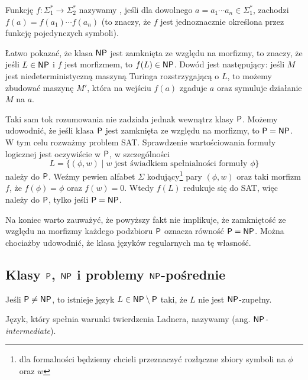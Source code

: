 \begin{remark}
    Funkcję $f : \Sigma_1^* \to \Sigma_2^*$ nazywamy , jeśli dla dowolnego $a = a_1 \cdots a_n \in \Sigma_1^*$, zachodzi $f(a) = f(a_1) \cdots f(a_n)$ (to znaczy, że $f$ jest jednoznacznie określona przez funkcję pojedynczych symboli).

    Łatwo pokazać, że klasa $\textsf{NP}$ jest zamknięta ze względu na morfizmy, to znaczy, że jeśli $L \in \textsf{NP}$ i $f$ jest morfizmem, to $f(L) \in \textsf{NP}$. Dowód jest następujący: jeśli $M$ jest niedeterministyczną maszyną Turinga rozstrzygającą o $L$, to możemy zbudować maszynę $M'$, która na wejściu $f(a)$ zgaduje $a$ oraz symuluje działanie $M$ na $a$.

    Taki sam tok rozumowania nie zadziała jednak wewnątrz klasy $\textsf{P}$. Możemy udowodnić, że jeśli klasa $\textsf{P}$ jest zamknięta ze względu na morfizmy, to $\textsf{P} = \textsf{NP}$.
    W tym celu rozważmy problem SAT\@. Sprawdzenie wartościowania formuły logicznej jest oczywiście w $\textsf{P}$, w szczególności
    \[ L = \{(\phi, w) \mid w \text{ jest świadkiem spełnialności formuły } \phi \} \]
    należy do $\textsf{P}$. Weźmy pewien alfabet $\Sigma$ kodujący\footnote{dla formalności będziemy chcieli przeznaczyć rozłączne zbiory symboli na $\phi$ oraz $w$} pary $(\phi, w)$ oraz taki morfizm $f$, że $f(\phi) = \phi$ oraz $f(w) = 0$. Wtedy $f(L)$ redukuje się do SAT, więc należy do $\textsf{P}$, tylko jeśli $\textsf{P} = \textsf{NP}$.

    Na koniec warto zauważyć, że powyższy fakt nie implikuje, że zamkniętość ze względu na morfizmy każdego podzbioru $\textsf{P}$ oznacza równość $\textsf{P} = \textsf{NP}$. Można chociażby udowodnić, że klasa języków regularnych ma tę własność.
\end{remark}

\subsection{Klasy $\textsf{P}$, $\textsf{NP}$ i problemy $\textsf{NP}$-pośrednie}

\begin{theorem}[Ladnera]
    Jeśli $\textsf{P} \neq \textsf{NP}$, to istnieje język $L \in \textsf{NP} \setminus \textsf{P}$ taki, że $L$ nie jest $\textsf{NP}$-zupełny.
\end{theorem}

Język, który spełnia warunki twierdzenia Ladnera, nazywamy  (ang. \textit{$\textsf{NP}$-intermediate}).

